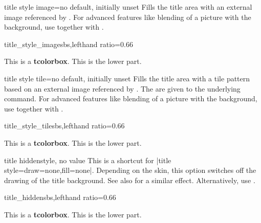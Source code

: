 \clearpage
\begin{docTcbKey}{title style image}{=}{no default, initially unset}
  Fills the title area with an external image referenced by .
  For advanced features like blending of a picture with the background,
  use  together with .

\begin{exdispExample*}{title_style_image}{sbs,lefthand ratio=0.66}

\begin{tcolorbox}[enhanced,title=My title,
  title style image=blueshade.png]
This is a \textbf{tcolorbox}.
\tcblower
This is the lower part.
\end{tcolorbox}
\end{exdispExample*}
\end{docTcbKey}


\begin{docTcbKey}{title style tile}{=}{no default, initially unset}
  Fills the title area with a tile pattern based on an external image referenced by .
  The  are given to the underlying  command.
  For advanced features like blending of a picture with the background,
  use  together with .

\begin{exdispExample*}{title_style_tile}{sbs,lefthand ratio=0.66}

\begin{tcolorbox}[enhanced,title=My title,
  title style tile={width=1cm}{pink_marble.png}]
This is a \textbf{tcolorbox}.
\tcblower
This is the lower part.
\end{tcolorbox}
\end{exdispExample*}
\end{docTcbKey}


\begin{docTcbKey}{title hidden}{}{style, no value}
  This is a shortcut for |title style={draw=none,fill=none}|.
  Depending on the skin, this option switches off the drawing of the
  title background. See also  for a similar effect.
  Alternatively, use .
\begin{exdispExample*}{title_hidden}{sbs,lefthand ratio=0.66}

\begin{tcolorbox}[title=My title,
  enhanced,title hidden]
This is a \textbf{tcolorbox}.
\tcblower
This is the lower part.
\end{tcolorbox}
\end{exdispExample*}
\end{docTcbKey}


